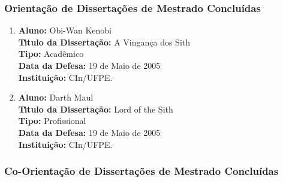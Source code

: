 \documentclass[a4paper,oneside,10pt]{article}
\begin{document}

\subsubsection{Orienta\c{c}\~{a}o de Disserta\c{c}\~{o}es de Mestrado Conclu\'{i}das}
\vspace{0.3cm}

\begin{enumerate}
\renewcommand{\labelenumi}{{\large\bfseries\arabic{enumi}.}}

\item       \textbf{Aluno:}  Obi-Wan Kenobi \mbox{} \\
            \textbf{T\'{\i}tulo da Disserta\c{c}\~{a}o:} A Vingança dos Sith\\
            \textbf{Tipo:} Acadêmico \\%
            \textbf{Data da Defesa:} 19 de Maio de 2005\\
            \textbf{Institui\c{c}\~{a}o:} CIn/UFPE.

\item       \textbf{Aluno:} Darth Maul \mbox{} \\
            \textbf{T\'{\i}tulo da Disserta\c{c}\~{a}o:} Lord of the Sith\\
            \textbf{Tipo:} Profissional\\
            \textbf{Data da Defesa:} 19 de Maio de 2005\\
            \textbf{Institui\c{c}\~{a}o:} CIn/UFPE.

\end{enumerate}


\subsubsection{Co-Orienta\c{c}\~{a}o de Disserta\c{c}\~{o}es de Mestrado Conclu\'{i}das}
\vspace{0.3cm}
\end{document}

